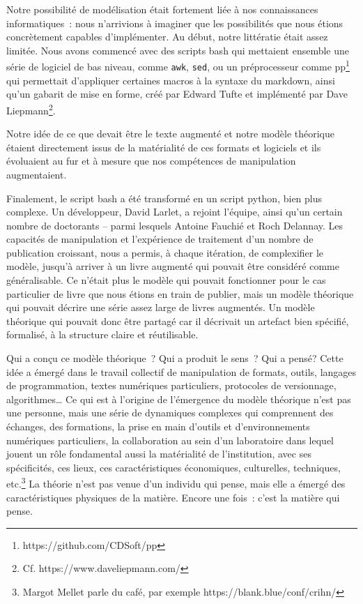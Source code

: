 Notre possibilité de modélisation était fortement liée à nos
connaissances informatiques~: nous n'arrivions à imaginer que les
possibilités que nous étions concrètement capables d'implémenter. Au
début, notre littératie était assez limitée. Nous avons commencé avec
des scripts bash qui mettaient ensemble une série de logiciel de bas
niveau, comme \texttt{awk}, \texttt{sed}, ou un préprocesseur comme
pp\footnote{https://github.com/CDSoft/pp} qui permettait d'appliquer
certaines macros à la syntaxe du markdown, ainsi qu'un gabarit de mise
en forme, créé par Edward Tufte et implémenté par Dave
Liepmann\footnote{Cf. https://www.daveliepmann.com/}.

Notre idée de ce que devait être le texte augmenté et notre modèle
théorique étaient directement issus de la matérialité de ces formats et
logiciels et ils évoluaient au fur et à mesure que nos compétences de
manipulation augmentaient.

Finalement, le script bash a été transformé en un script python, bien
plus complexe. Un développeur, David Larlet, a rejoint l'équipe, ainsi
qu'un certain nombre de doctorants -- parmi lesquels Antoine Fauchié et
Roch Delannay. Les capacités de manipulation et l'expérience de
traitement d'un nombre de publication croissant, nous a permis, à chaque
itération, de complexifier le modèle, jusqu'à arriver à un livre
augmenté qui pouvait être considéré comme généralisable. Ce n'était plus
le modèle qui pouvait fonctionner pour le cas particulier de livre que
nous étions en train de publier, mais un modèle théorique qui pouvait
décrire une série assez large de livres augmentés. Un modèle théorique
qui pouvait donc être partagé car il décrivait un artefact bien
spécifié, formalisé, à la structure claire et réutilisable.

Qui a conçu ce modèle théorique~? Qui a produit le sens~? Qui a pensé?
Cette idée a émergé dans le travail collectif de manipulation de
formats, outils, langages de programmation, textes numériques
particuliers, protocoles de versionnage, algorithmes\ldots{} Ce qui est
à l'origine de l'émergence du modèle théorique n'est pas une personne,
mais une série de dynamiques complexes qui comprennent des échanges, des
formations, la prise en main d'outils et d'environnements numériques
particuliers, la collaboration au sein d'un laboratoire dans lequel
jouent un rôle fondamental aussi la matérialité de l'institution, avec
ses spécificités, ces lieux, ces caractéristiques économiques,
culturelles, techniques, etc.\footnote{Margot Mellet parle du café, par
  exemple https://blank.blue/conf/crihn/} La théorie n'est pas venue
d'un individu qui pense, mais elle a émergé des caractéristiques
physiques de la matière. Encore une fois~: c'est la matière qui pense.

